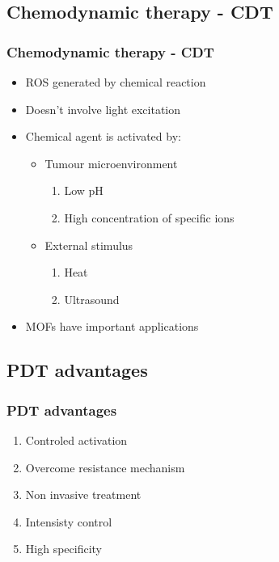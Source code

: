 \documentclass[aspectratio=169,fleqn,table]{beamer}
\begin{document}
\subsection{Chemodynamic therapy - CDT}
\begin{frame}
\frametitle{Chemodynamic therapy - CDT}

\begin{itemize}
	\item
	ROS generated by chemical reaction
	\item
	Doesn't involve light excitation
	\item
	Chemical agent is activated by:
	\begin{itemize}
    	\item
        Tumour microenvironment	
		\begin{enumerate}
			\item
			Low pH
			\item
			High concentration of specific ions
		\end{enumerate}
		\item
		External stimulus
		\begin{enumerate}
			\item
			Heat
			\item
			Ultrasound
		\end{enumerate}
	\end{itemize}
	\item
	MOFs have important applications
\end{itemize}     	      
		      
\end{frame}


\subsection{PDT advantages}
\begin{frame}
\frametitle{PDT advantages}

\begin{enumerate}
	\item
	Controled activation
	\item
	Overcome resistance mechanism 
	\item
	Non invasive treatment
	\item
	Intensisty control
	\item
	High specificity
\end{enumerate}

\end{frame}
\end{document}
